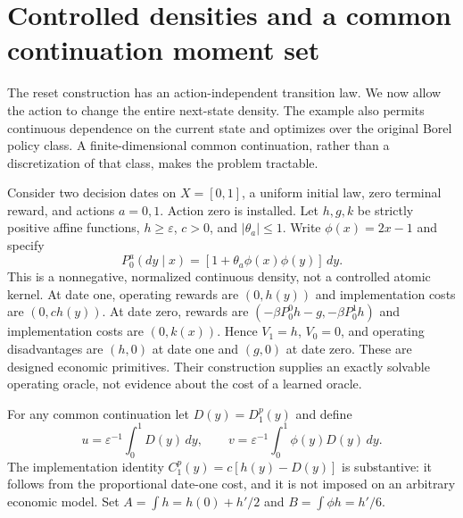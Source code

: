 \section{Controlled densities and a common continuation moment set}\label{sec:controlled51}
The reset construction has an action-independent transition law. We now allow the action to change the entire next-state density. The example also permits continuous dependence on the current state and optimizes over the original Borel policy class. A finite-dimensional common continuation, rather than a discretization of that class, makes the problem tractable.

Consider two decision dates on $X=[0,1]$, a uniform initial law, zero terminal reward, and actions $a=0,1$. Action zero is installed. Let $h,g,k$ be strictly positive affine functions, $h\ge\varepsilon$, $c>0$, and $|\theta_a|\le1$. Write $\phi(x)=2x-1$ and specify
\begin{equation}\label{eq:kernel51}
 P_0^a(dy\mid x)=[1+\theta_a\phi(x)\phi(y)]\,dy.
\end{equation}
This is a nonnegative, normalized continuous density, not a controlled atomic kernel. At date one, operating rewards are $(0,h(y))$ and implementation costs are $(0,ch(y))$. At date zero, rewards are $(-\beta P_0^0h-g,-\beta P_0^1h)$ and implementation costs are $(0,k(x))$. Hence $V_1=h$, $V_0=0$, and operating disadvantages are $(h,0)$ at date one and $(g,0)$ at date zero. These are designed economic primitives. Their construction supplies an exactly solvable operating oracle, not evidence about the cost of a learned oracle.

For any common continuation let $D(y)=D_1^p(y)$ and define
\[
 u=\varepsilon^{-1}\int_0^1D(y)\,dy,\qquad
 v=\varepsilon^{-1}\int_0^1\phi(y)D(y)\,dy.
\]
The implementation identity $C_1^p(y)=c[h(y)-D(y)]$ is substantive: it follows from the proportional date-one cost, and it is not imposed on an arbitrary economic model. Set $A=\int h=h(0)+h'/2$ and $B=\int\phi h=h'/6$.

